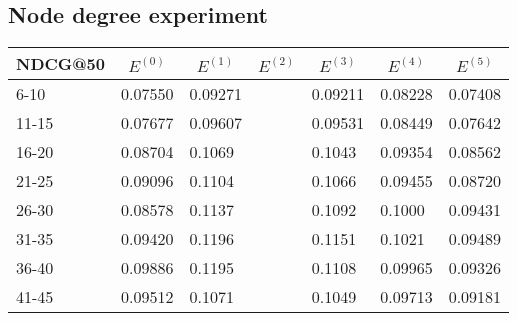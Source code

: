 \subsection{Node degree experiment}

\begin{table*}[]
    \begin{tabular}{|l|l|l|l|l|l|l|}
    \hline
    NDCG@50 & \multicolumn{1}{c|}{$E^{(0)}$} & \multicolumn{1}{c|}{$E^{(1)}$} & \multicolumn{1}{c|}{$E^{(2)}$} & \multicolumn{1}{c|}{$E^{(3)}$} & \multicolumn{1}{c|}{$E^{(4)}$} & \multicolumn{1}{c|}{$E^{(5)}$} \\ \hline
    6-10    & 0.07550                        & 0.09271                        &                                & 0.09211                        & 0.08228                        & 0.07408                        \\ \hline
    11-15   & 0.07677                        & 0.09607                        &                                & 0.09531                        & 0.08449                        & 0.07642                        \\ \hline
    16-20   & 0.08704                        & 0.1069                         &                                & 0.1043                         & 0.09354                        & 0.08562                        \\ \hline
    21-25   & 0.09096                        & 0.1104                         &                                & 0.1066                         & 0.09455                        & 0.08720                        \\ \hline
    26-30   & 0.08578                        & 0.1137                         &                                & 0.1092                         & 0.1000                         & 0.09431                        \\ \hline
    31-35   & 0.09420                        & 0.1196                         &                                & 0.1151                         & 0.1021                         & 0.09489                        \\ \hline
    36-40   & 0.09886                        & 0.1195                         &                                & 0.1108                         & 0.09965                        & 0.09326                        \\ \hline
    41-45   & 0.09512                        & 0.1071                         &                                & 0.1049                         & 0.09713                        & 0.09181                        \\ \hline

\end{tabular}
\end{table*}
